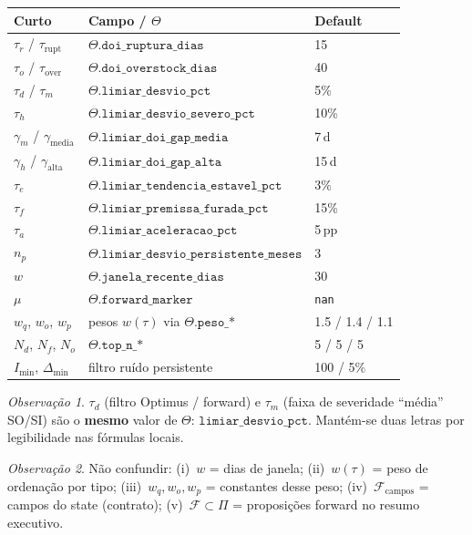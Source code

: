 \documentclass[a4paper, 12pt]{report}
\theoremstyle{definition}
\theoremstyle{remark}
\newtheorem{observacao}{Observa\c{c}\~ao}[chapter]
\begin{document}
\begin{center}
\begin{tabular}{lll}
  \toprule
  \textbf{Curto} & \textbf{Campo / $\Theta$} & \textbf{Default} \\
  \midrule
  $\tau_r$ / $\tau_{\text{rupt}}$ & $\Theta.\texttt{doi\_ruptura\_dias}$ & 15 \\
  $\tau_o$ / $\tau_{\text{over}}$ & $\Theta.\texttt{doi\_overstock\_dias}$ & 40 \\
  $\tau_d$ / $\tau_m$ & $\Theta.\texttt{limiar\_desvio\_pct}$ & 5\% \\
  $\tau_h$ & $\Theta.\texttt{limiar\_desvio\_severo\_pct}$ & 10\% \\
  $\gamma_m$ / $\gamma_{\text{media}}$ & $\Theta.\texttt{limiar\_doi\_gap\_media}$ & 7\,d \\
  $\gamma_h$ / $\gamma_{\text{alta}}$ & $\Theta.\texttt{limiar\_doi\_gap\_alta}$ & 15\,d \\
  $\tau_e$ & $\Theta.\texttt{limiar\_tendencia\_estavel\_pct}$ & 3\% \\
  $\tau_f$ & $\Theta.\texttt{limiar\_premissa\_furada\_pct}$ & 15\% \\
  $\tau_a$ & $\Theta.\texttt{limiar\_aceleracao\_pct}$ & 5\,pp \\
  $n_p$ & $\Theta.\texttt{limiar\_desvio\_persistente\_meses}$ & 3 \\
  $w$ & $\Theta.\texttt{janela\_recente\_dias}$ & 30 \\
  $\mu$ & $\Theta.\texttt{forward\_marker}$ & \texttt{nan} \\
  $w_q$, $w_o$, $w_p$ & pesos $w(\tau)$ via $\Theta.\texttt{peso\_*}$ & 1.5 / 1.4 / 1.1 \\
  $N_d$, $N_f$, $N_o$ & $\Theta.\texttt{top\_n\_*}$ & 5 / 5 / 5 \\
  $I_{\min}$, $\Delta_{\min}$ & filtro ru\'ido persistente & 100 / 5\% \\
  \bottomrule
\end{tabular}
\end{center}

\begin{observacao}
  $\tau_d$ (filtro Optimus / forward) e $\tau_m$ (faixa de severidade
  ``m\'edia'' SO/SI) s\~ao o \textbf{mesmo} valor de $\Theta$:
  $\texttt{limiar\_desvio\_pct}$. Mant\'em-se duas letras por legibilidade
  nas f\'ormulas locais.
\end{observacao}

\begin{observacao}
  N\~ao confundir: (i)~$w$ = dias de janela; (ii)~$w(\tau)$ = peso de
  ordena\c{c}\~ao por tipo; (iii)~$w_q,w_o,w_p$ = constantes desse peso;
  (iv)~$\mathcal{F}_{\text{campos}}$ = campos do state (contrato);
  (v)~$\mathcal{F}\subset\Pi$ = proposi\c{c}\~oes forward no resumo executivo.
\end{observacao}
\end{document}
